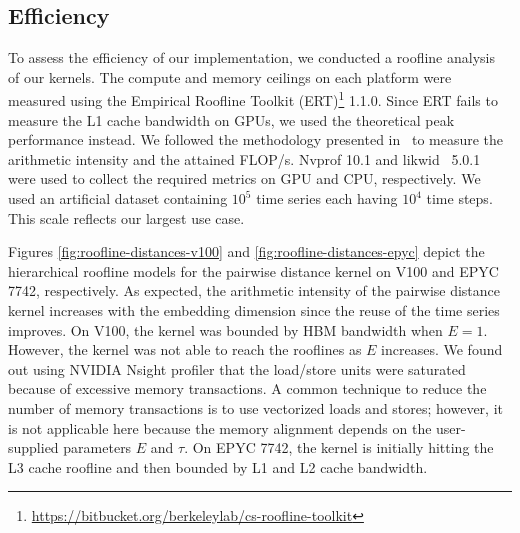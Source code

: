 \documentclass{acmart}
\begin{document}
\subsection{Efficiency}

To assess the efficiency of our implementation, we conducted a roofline
analysis~\cite{Williams2008} of our kernels. The compute and memory ceilings
on each platform were measured using the Empirical Roofline Toolkit (ERT)\footnote{\url{https://bitbucket.org/berkeleylab/cs-roofline-toolkit}} 1.1.0.
Since ERT fails to measure the L1 cache bandwidth on GPUs, we used the
theoretical peak performance instead. We followed the methodology presented
in~\cite{Yang2020a,Yang2020b} to measure the arithmetic intensity and the
attained FLOP/s. Nvprof 10.1 and likwid~\cite{Treibig2010} 5.0.1 were used to
collect the required metrics on GPU and CPU, respectively.
We used an artificial dataset containing $10^5$ time series each having $10^4$
time steps. This scale reflects our largest use case.


Figures \ref{fig:roofline-distances-v100} and \ref{fig:roofline-distances-epyc}
depict the hierarchical roofline models for the pairwise distance kernel on V100
and EPYC 7742, respectively. As expected, the arithmetic intensity of the
pairwise distance kernel increases with the embedding dimension since the
reuse of the time series improves. On V100, the kernel was bounded by HBM
bandwidth when $E=1$. However, the kernel was not able to reach the rooflines
as $E$ increases. We found out using NVIDIA Nsight profiler that the load/store
units were saturated because of excessive memory transactions. A common
technique to reduce the number of memory transactions is to use vectorized
loads and stores; however, it is not applicable here because the memory
alignment depends on the user-supplied parameters $E$ and $\tau$. On EPYC 7742,
the kernel is initially hitting the L3 cache roofline and then bounded by
L1 and L2 cache bandwidth.
\end{document}
